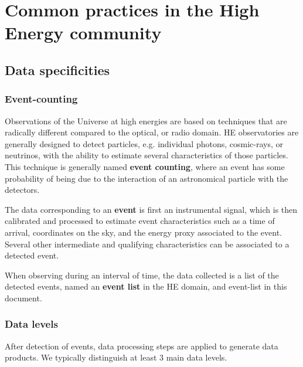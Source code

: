 \documentclass[11pt,a4paper]{ivoa}
\begin{document}
\section{Common practices in the High Energy community}
\label{sec:vhespec}

\subsection{Data specificities}

\subsubsection{Event-counting}

Observations of the Universe at high energies are based on techniques that are radically different compared to the optical, or radio domain. HE observatories are generally designed to detect particles, e.g. individual photons, cosmic-rays, or neutrinos, with the ability to estimate several characteristics of those particles. This technique is generally named \textbf{event counting}, where an event has some probability of being due to the interaction of an astronomical particle with the detectors.

The data corresponding to an \textbf{event} is first an instrumental signal, which is then calibrated and processed to estimate event characteristics such as a time of arrival, coordinates on the sky, and the energy proxy associated to the event. Several other intermediate and qualifying characteristics can be associated to a detected event.

When observing during an interval of time, the data collected is a list of the detected events, named an \textbf{event list} in the HE domain, and event-list in this document.




\subsubsection{Data levels}\label{sec:datalevels}

After detection of events, data processing steps are applied to generate data products. We typically distinguish at least 3 main data levels.
\end{document}

